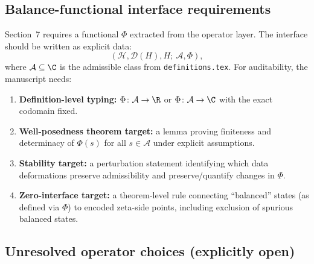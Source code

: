 
\subsection{Balance-functional interface requirements}

Section~7 requires a functional $\Phi$ extracted from the operator layer. The
interface should be written as explicit data:
\[
(\mathcal{H},\mathcal{D}(H),H;\ \mathcal{A},\Phi),
\]
where $\mathcal{A}\subseteq\C$ is the admissible class from
\texttt{definitions.tex}. For auditability, the manuscript needs:
\begin{enumerate}
  \item \textbf{Definition-level typing:}
  \(\Phi\colon\mathcal{A}\to\R\) or \(\Phi\colon\mathcal{A}\to\C\)
  with the exact codomain fixed.
  \item \textbf{Well-posedness theorem target:} a lemma proving finiteness and
  determinacy of $\Phi(s)$ for all $s\in\mathcal{A}$ under explicit
  assumptions.
  \item \textbf{Stability target:} a perturbation statement identifying which
  data deformations preserve admissibility and preserve/quantify changes in
  $\Phi$.
  \item \textbf{Zero-interface target:} a theorem-level rule connecting
  ``balanced'' states (as defined via $\Phi$) to encoded zeta-side points,
  including exclusion of spurious balanced states.
\end{enumerate}


\subsection{Unresolved operator choices (explicitly open)}

